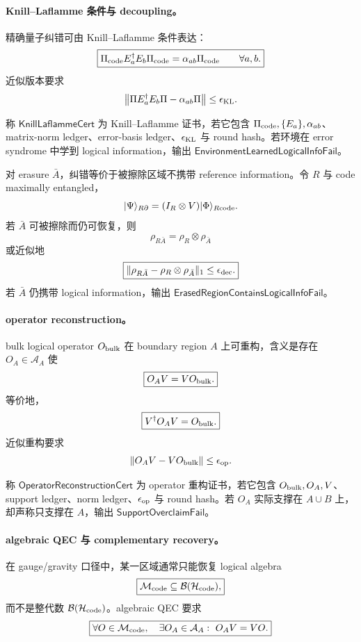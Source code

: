 \paragraph{Knill--Laflamme 条件与 decoupling。}
精确量子纠错可由 Knill--Laflamme 条件表达：
\[
\boxed{
\Pi_{\rm code}E_a^\dagger E_b\Pi_{\rm code}
=
\alpha_{ab}\Pi_{\rm code}
\qquad
\forall a,b.
}
\]
近似版本要求
\[
\left\|
\Pi E_a^\dagger E_b\Pi-\alpha_{ab}\Pi
\right\|
\le
\epsilon_{\rm KL}.
\]

\begin{definition}\label{def:typed-address-biaxial-completion-knill-laflamme-cert}
称 \(\mathsf{KnillLaflammeCert}\) 为 Knill--Laflamme 证书，若它包含 \(\Pi_{\rm code},\{E_a\},\alpha_{ab}\)、matrix-norm ledger、error-basis ledger、\(\epsilon_{\rm KL}\) 与 round hash。若环境在 error syndrome 中学到 logical information，输出 \(\mathsf{EnvironmentLearnedLogicalInfoFail}\)。
\end{definition}

对 erasure \(\bar A\)，纠错等价于被擦除区域不携带 reference information。令 \(R\) 与 code maximally entangled，
\[
|\Psi\rangle_{R\partial}
=
(I_R\otimes V)|\Phi\rangle_{R{\rm code}}.
\]
若 \(\bar A\) 可被擦除而仍可恢复，则
\[
\boxed{
\rho_{R\bar A}=\rho_R\otimes\rho_{\bar A}
}
\]
或近似地
\[
\boxed{
\|\rho_{R\bar A}-\rho_R\otimes\rho_{\bar A}\|_1
\le
\epsilon_{\rm dec}.
}
\]
若 \(\bar A\) 仍携带 logical information，输出 \(\mathsf{ErasedRegionContainsLogicalInfoFail}\)。

\paragraph{operator reconstruction。}
bulk logical operator \(O_{\rm bulk}\) 在 boundary region \(A\) 上可重构，含义是存在 \(O_A\in\mathcal A_A\) 使
\[
\boxed{
O_A V=V O_{\rm bulk}.
}
\]
等价地，
\[
\boxed{
V^\dagger O_A V=O_{\rm bulk}.
}
\]
近似重构要求
\[
\|O_A V-VO_{\rm bulk}\|\le\epsilon_{\rm op}.
\]

\begin{definition}\label{def:typed-address-biaxial-completion-operator-reconstruction-cert}
称 \(\mathsf{OperatorReconstructionCert}\) 为 operator 重构证书，若它包含 \(O_{\rm bulk},O_A,V\)、support ledger、norm ledger、\(\epsilon_{\rm op}\) 与 round hash。若 \(O_A\) 实际支撑在 \(A\cup B\) 上，却声称只支撑在 \(A\)，输出 \(\mathsf{SupportOverclaimFail}\)。
\end{definition}

\paragraph{algebraic QEC 与 complementary recovery。}
在 gauge/gravity 口径中，某一区域通常只能恢复 logical algebra
\[
\boxed{
\mathcal M_{\rm code}\subseteq\mathcal B(\mathcal H_{\rm code}),
}
\]
而不是整代数 \(\mathcal B(\mathcal H_{\rm code})\)。algebraic QEC 要求
\[
\boxed{
\forall O\in\mathcal M_{\rm code},\quad
\exists O_A\in\mathcal A_A:\ O_AV=VO.
}
\]

